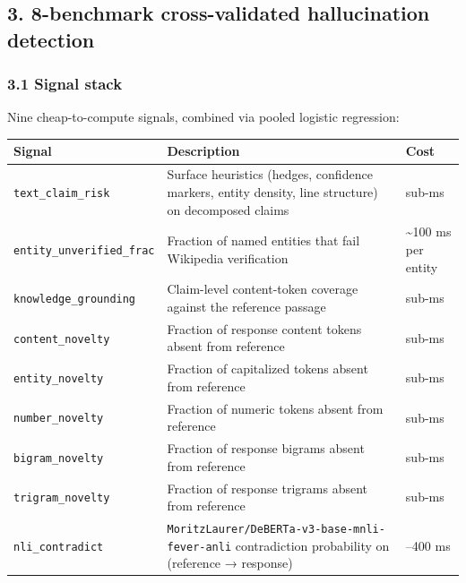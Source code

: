 \documentclass[
  11pt]{article}
\newcounter{none} %
\begin{document}
\subsection{3. 8-benchmark cross-validated hallucination
detection}\label{benchmark-cross-validated-hallucination-detection}

\subsubsection{3.1 Signal stack}\label{signal-stack}

Nine cheap-to-compute signals, combined via pooled logistic regression:

{\def\LTcaptype{none} %
\begin{longtable}[]{@{}
  >{\raggedright\arraybackslash}p{}
  >{\raggedright\arraybackslash}p{}
  >{\raggedright\arraybackslash}p{}@{}}
\toprule\noalign{}
\begin{minipage}[b]{\linewidth}\raggedright
Signal
\end{minipage} & \begin{minipage}[b]{\linewidth}\raggedright
Description
\end{minipage} & \begin{minipage}[b]{\linewidth}\raggedright
Cost
\end{minipage} \\
\midrule\noalign{}
\endhead
\bottomrule\noalign{}
\endlastfoot
\texttt{text\_claim\_risk} & Surface heuristics (hedges, confidence
markers, entity density, line structure) on decomposed claims &
sub-ms \\
\texttt{entity\_unverified\_frac} & Fraction of named entities that fail
Wikipedia verification & \textasciitilde100 ms per entity \\
\texttt{knowledge\_grounding} & Claim-level content-token coverage
against the reference passage & sub-ms \\
\texttt{content\_novelty} & Fraction of response content tokens absent
from reference & sub-ms \\
\texttt{entity\_novelty} & Fraction of capitalized tokens absent from
reference & sub-ms \\
\texttt{number\_novelty} & Fraction of numeric tokens absent from
reference & sub-ms \\
\texttt{bigram\_novelty} & Fraction of response bigrams absent from
reference & sub-ms \\
\texttt{trigram\_novelty} & Fraction of response trigrams absent from
reference & sub-ms \\
\texttt{nli\_contradict} &
\texttt{MoritzLaurer/DeBERTa-v3-base-mnli-fever-anli} contradiction
probability on (reference → response) & 10--400 ms \\
\end{longtable}
}
\end{document}
